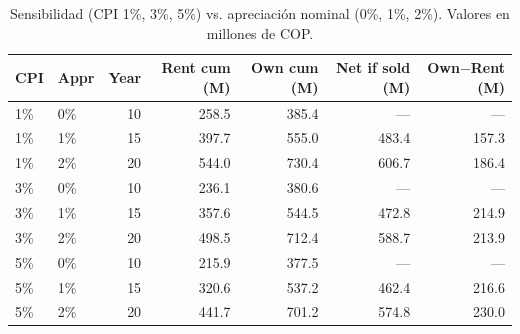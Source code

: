 \documentclass[12pt]{article}
\begin{document}
\begin{table}[h]
\centering
\small
\begin{tabular}{llrrrrr}
\hline
CPI & Appr & Year & Rent cum (M) & Own cum (M) & Net if sold (M) & Own$-$Rent (M) \\
\hline
1\% & 0\% & 10 & 258.5 & 385.4 & --- & --- \\
1\% & 1\% & 15 & 397.7 & 555.0 & 483.4 & 157.3 \\
1\% & 2\% & 20 & 544.0 & 730.4 & 606.7 & 186.4 \\
3\% & 0\% & 10 & 236.1 & 380.6 & --- & --- \\
3\% & 1\% & 15 & 357.6 & 544.5 & 472.8 & 214.9 \\
3\% & 2\% & 20 & 498.5 & 712.4 & 588.7 & 213.9 \\
5\% & 0\% & 10 & 215.9 & 377.5 & --- & --- \\
5\% & 1\% & 15 & 320.6 & 537.2 & 462.4 & 216.6 \\
5\% & 2\% & 20 & 441.7 & 701.2 & 574.8 & 230.0 \\ \hline
\end{tabular}
\caption{Sensibilidad (CPI 1\%, 3\%, 5\%) vs. apreciaci\'on nominal (0\%, 1\%, 2\%). Valores en millones de COP.}
\label{tab:sensitivity}
\end{table}
\end{document}
